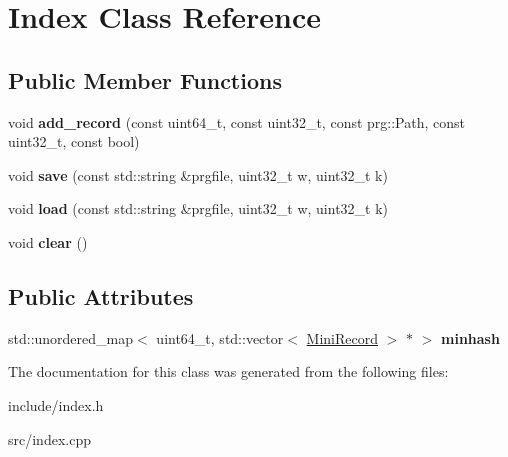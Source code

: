 \hypertarget{classIndex}{}\section{Index Class Reference}
\label{classIndex}
\subsection*{Public Member Functions}
\begin{DoxyCompactItemize}
\item 
\mbox{\label{classIndex_af072c82e443c23d5918b07425aceabd9}} 
void {\bfseries add\+\_\+record} (const uint64\+\_\+t, const uint32\+\_\+t, const prg\+::\+Path, const uint32\+\_\+t, const bool)
\item 
\mbox{\label{classIndex_a8253bb51498ba7d3922a2935fb66831d}} 
void {\bfseries save} (const std\+::string \&prgfile, uint32\+\_\+t w, uint32\+\_\+t k)
\item 
\mbox{\label{classIndex_ac8e0535daf6ebed41e6c9c123b660c75}} 
void {\bfseries load} (const std\+::string \&prgfile, uint32\+\_\+t w, uint32\+\_\+t k)
\item 
\mbox{\label{classIndex_a734ad3d7b0f08e98616a9ec4207cae27}} 
void {\bfseries clear} ()
\end{DoxyCompactItemize}
\subsection*{Public Attributes}
\begin{DoxyCompactItemize}
\item 
\mbox{\label{classIndex_af8e40333f9aa0ec4c2d603d2878c3cf2}} 
std\+::unordered\+\_\+map$<$ uint64\+\_\+t, std\+::vector$<$ \hyperlink{structMiniRecord}{Mini\+Record} $>$ $\ast$ $>$ {\bfseries minhash}
\end{DoxyCompactItemize}


The documentation for this class was generated from the following files\+:\begin{DoxyCompactItemize}
\item 
include/index.\+h\item 
src/index.\+cpp\end{DoxyCompactItemize}
